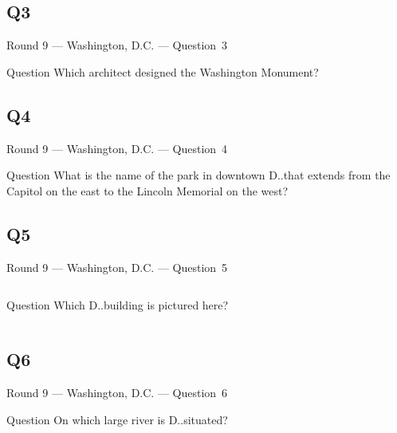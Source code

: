 \documentclass[11pt]{beamer}
\begin{document}
\subsection*{Q3}
\begin{frame}[t]{Round 9 --- Washington, D.C. --- \mbox{Question 3}}
    \vspace{-0.5em}
    \begin{block}{Question}
        Which architect designed the Washington Monument?
    \end{block}
\end{frame}
\subsection*{Q4}
\begin{frame}[t]{Round 9 --- Washington, D.C. --- \mbox{Question 4}}
    \vspace{-0.5em}
    \begin{block}{Question}
        What is the name of the park in downtown D.\@C.\@ that extends from the Capitol on the east to the Lincoln Memorial on the west?
    \end{block}
\end{frame}
\subsection*{Q5}
\begin{frame}[t]{Round 9 --- Washington, D.C. --- \mbox{Question 5}}
    \vspace{-0.5em}
    \begin{columns}[T,totalwidth=\linewidth]
        \begin{column}{0.32\linewidth}
            \begin{block}{Question}
                Which D.\@C.\@ building is pictured here?
            \end{block}
        \end{column}
        \begin{column}{0.65\linewidth}
            \begin{center}
                \texttt{[image: \{Images/libraryofcongress]}.jpg}
            \end{center}
        \end{column}
    \end{columns}
\end{frame}
\subsection*{Q6}
\begin{frame}[t]{Round 9 --- Washington, D.C. --- \mbox{Question 6}}
    \vspace{-0.5em}
    \begin{block}{Question}
        On which large river is D.\@C.\@ situated?
    \end{block}
\end{frame}
\end{document}
